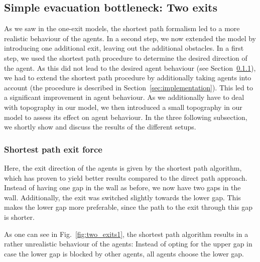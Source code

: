\documentclass[11pt]{article}
\begin{document}
\subsection{Simple evacuation bottleneck: Two exits}

As we saw in the one-exit models, the shortest path formalism led to a more realistic behaviour of the agents. In a second step, we now extended the model by introducing one additional exit, leaving out the additional obstacles. In a first step, we used the shortest path procedure to determine the desired direction of the agent. As this did not lead to the desired agent behaviour (see Section~\ref{sec:two_exits1}), we had to extend the shortest path procedure by additionally taking agents into account (the procedure is described in Section~\ref{sec:implementation}). This led to a significant improvement in agent behaviour. As we additionally have to deal with topography in our model, we then introduced a small topography in our model to assess its effect on agent behaviour. In the three following subsection, we shortly show and discuss the results of the different setups.

\subsubsection{Shortest path exit force}\label{sec:two_exits1}

Here, the exit direction of the agents is given by the shortest path algorithm, which has proven to yield better results compared to the direct path approach. Instead of having one gap in the wall as before, we now have two gaps in the wall. Additionally, the exit was switched slightly towards the lower gap. This makes the lower gap more preferable, since the path to the exit through this gap is shorter.

As one can see in Fig.~\ref{fig:two_exits1}, the shortest path algorithm results in a rather unrealistic behaviour of the agents: Instead of opting for the upper gap in case the lower gap is blocked by other agents, all agents choose the lower gap.
\end{document}

